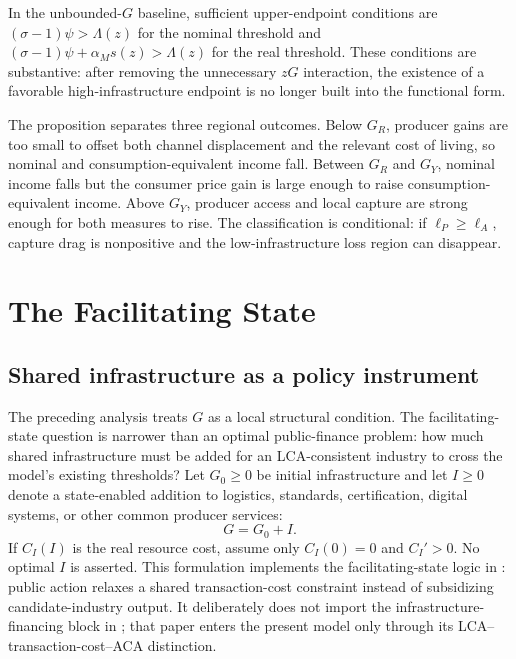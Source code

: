 \documentclass[11pt]{article}
\theoremstyle{definition}
\theoremstyle{remark}
\begin{document}
In the unbounded-\(G\) baseline, sufficient upper-endpoint conditions are
\((\sigma-1)\psi>\Lambda(z)\) for the nominal threshold and
\((\sigma-1)\psi+\alpha_Ms(z)>\Lambda(z)\) for the real threshold.  These
conditions are substantive: after removing the unnecessary \(zG\) interaction,
the existence of a favorable high-infrastructure endpoint is no longer built
into the functional form.

The proposition separates three regional outcomes.  Below \(G_R\), producer
gains are too small to offset both channel displacement and the relevant cost
of living, so nominal and consumption-equivalent income fall.  Between
\(G_R\) and \(G_Y\), nominal income falls but the consumer price gain is large
enough to raise consumption-equivalent income.  Above \(G_Y\), producer access
and local capture are strong enough for both measures to rise.  The
classification is conditional: if \(\ell_P\geq\ell_A\), capture drag is
nonpositive and the low-infrastructure loss region can disappear.

\section{The Facilitating State}

\subsection{Shared infrastructure as a policy instrument}

The preceding analysis treats \(G\) as a local structural condition.  The
facilitating-state question is narrower than an optimal public-finance
problem: how much shared infrastructure must be added for an
LCA-consistent industry to cross the model's existing thresholds?  Let
\(G_0\geq0\) be initial infrastructure and let \(I\geq0\) denote a
state-enabled addition to logistics, standards, certification, digital
systems, or other common producer services:
\begin{equation}
 G=G_0+I.
 \label{eq:facilitating_investment}
\end{equation}
If \(C_I(I)\) is the real resource cost, assume only
\(C_I(0)=0\) and \(C_I'>0\).  No optimal \(I\) is asserted.  This formulation
implements the facilitating-state logic in
\citet{LinMonga2010,Lin2011,Lin2012}: public action relaxes a shared
transaction-cost constraint instead of subsidizing candidate-industry output.
It deliberately does not import the infrastructure-financing block in
\citet{LinWang2023}; that paper enters the present model only through its
LCA--transaction-cost--ACA distinction.
\end{document}
